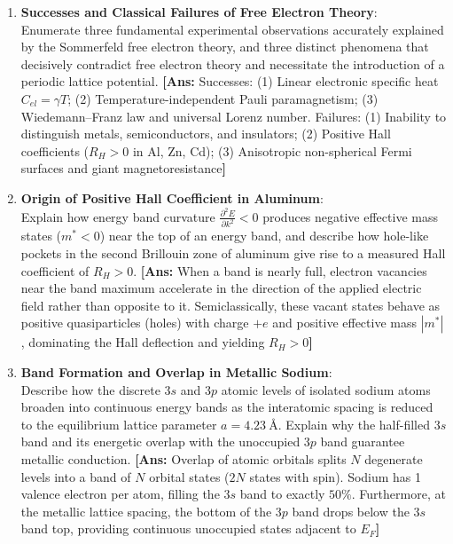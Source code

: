 \documentclass[11pt,a4paper]{article}
\begin{document}
\begin{enumerate}[label=\textbf{\arabic*.}, resume, leftmargin=*]
    \item \textbf{Successes and Classical Failures of Free Electron Theory}:\\
    Enumerate three fundamental experimental observations accurately explained by the Sommerfeld free electron theory, and three distinct phenomena that decisively contradict free electron theory and necessitate the introduction of a periodic lattice potential.
    \textbf{[Ans:} Successes: (1) Linear electronic specific heat $C_{el} = \gamma T$; (2) Temperature-independent Pauli paramagnetism; (3) Wiedemann--Franz law and universal Lorenz number. Failures: (1) Inability to distinguish metals, semiconductors, and insulators; (2) Positive Hall coefficients ($R_H > 0$ in Al, Zn, Cd); (3) Anisotropic non-spherical Fermi surfaces and giant magnetoresistance\textbf{]}

    \item \textbf{Origin of Positive Hall Coefficient in Aluminum}:\\
    Explain how energy band curvature $\frac{\partial^2 E}{\partial k^2} < 0$ produces negative effective mass states ($m^* < 0$) near the top of an energy band, and describe how hole-like pockets in the second Brillouin zone of aluminum give rise to a measured Hall coefficient of $R_H > 0$.
    \textbf{[Ans:} When a band is nearly full, electron vacancies near the band maximum accelerate in the direction of the applied electric field rather than opposite to it. Semiclassically, these vacant states behave as positive quasiparticles (holes) with charge $+e$ and positive effective mass $|m^*|$, dominating the Hall deflection and yielding $R_H > 0$\textbf{]}

    \item \textbf{Band Formation and Overlap in Metallic Sodium}:\\
    Describe how the discrete $3s$ and $3p$ atomic levels of isolated sodium atoms broaden into continuous energy bands as the interatomic spacing is reduced to the equilibrium lattice parameter $a = 4.23\ \text{\AA}$. Explain why the half-filled $3s$ band and its energetic overlap with the unoccupied $3p$ band guarantee metallic conduction.
    \textbf{[Ans:} Overlap of atomic orbitals splits $N$ degenerate levels into a band of $N$ orbital states ($2N$ states with spin). Sodium has 1 valence electron per atom, filling the $3s$ band to exactly $50\%$. Furthermore, at the metallic lattice spacing, the bottom of the $3p$ band drops below the $3s$ band top, providing continuous unoccupied states adjacent to $E_F$\textbf{]}


\end{enumerate}
\end{document}
